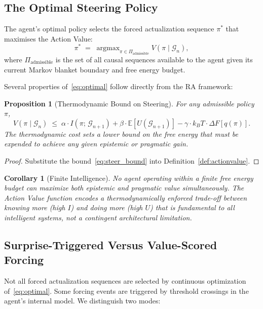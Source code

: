 \documentclass[11pt,a4paper]{article}
\newtheorem{proposition}[theorem]{Proposition}
\newtheorem{corollary}[theorem]{Corollary}
\theoremstyle{remark}
\newcommand{\GG}{\mathcal{G}}
\begin{document}
\subsection{The Optimal Steering Policy}

The agent's optimal policy selects the forced actualization sequence $\pi^*$ that
maximises the Action Value:
\begin{equation}
  \pi^* \;=\; \operatorname{argmax}_{\pi \in \Pi_{\mathrm{admissible}}}
  V(\pi \mid \GG_n),
  \label{eq:optimal}
\end{equation}
where $\Pi_{\mathrm{admissible}}$ is the set of all causal sequences available to
the agent given its current Markov blanket boundary and free energy budget.

Several properties of~\eqref{eq:optimal} follow directly from the RA framework:

\begin{proposition}[Thermodynamic Bound on Steering]
\label{prop:bound}
For any admissible policy $\pi$,
\begin{equation}
  V(\pi \mid \GG_n) \;\leq\;
  \alpha \cdot I(\pi;\, \GG_{n+1})
  + \beta \cdot \mathbb{E}[U(\GG_{n+1})]
  - \gamma \cdot k_BT \cdot \Delta F[q(\pi)].
\end{equation}
The thermodynamic cost sets a lower bound on the free energy that must be
expended to achieve any given epistemic or pragmatic gain.
\end{proposition}

\begin{proof}
Substitute the bound~\eqref{eq:steer_bound} into Definition~\ref{def:actionvalue}.
\end{proof}

\begin{corollary}[Finite Intelligence]
No agent operating within a finite free energy budget can maximize both epistemic
and pragmatic value simultaneously. The Action Value function encodes a
thermodynamically enforced trade-off between knowing more (high $I$) and doing more
(high $U$) that is fundamental to all intelligent systems, not a contingent
architectural limitation.
\end{corollary}

\subsection{Surprise-Triggered Versus Value-Scored Forcing}

Not all forced actualization sequences are selected by continuous optimization
of~\eqref{eq:optimal}. Some forcing events are triggered by threshold crossings
in the agent's internal model. We distinguish two modes:
\end{document}
